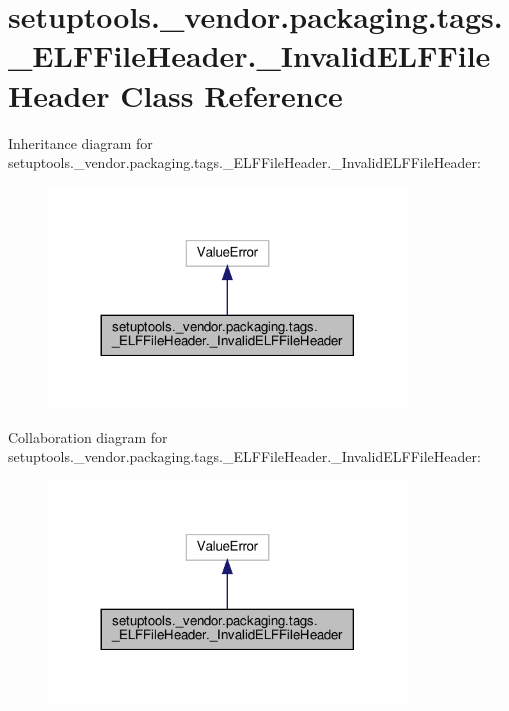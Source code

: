 \hypertarget{classsetuptools_1_1__vendor_1_1packaging_1_1tags_1_1__ELFFileHeader_1_1__InvalidELFFileHeader}{}\section{setuptools.\+\_\+vendor.\+packaging.\+tags.\+\_\+\+E\+L\+F\+File\+Header.\+\_\+\+Invalid\+E\+L\+F\+File\+Header Class Reference}
\label{classsetuptools_1_1__vendor_1_1packaging_1_1tags_1_1__ELFFileHeader_1_1__InvalidELFFileHeader}


Inheritance diagram for setuptools.\+\_\+vendor.\+packaging.\+tags.\+\_\+\+E\+L\+F\+File\+Header.\+\_\+\+Invalid\+E\+L\+F\+File\+Header\+:
\nopagebreak
\begin{figure}[H]
\begin{center}
\leavevmode
\includegraphics[width=269pt]{classsetuptools_1_1__vendor_1_1packaging_1_1tags_1_1__ELFFileHeader_1_1__InvalidELFFileHeader__inherit__graph}
\end{center}
\end{figure}


Collaboration diagram for setuptools.\+\_\+vendor.\+packaging.\+tags.\+\_\+\+E\+L\+F\+File\+Header.\+\_\+\+Invalid\+E\+L\+F\+File\+Header\+:
\nopagebreak
\begin{figure}[H]
\begin{center}
\leavevmode
\includegraphics[width=269pt]{classsetuptools_1_1__vendor_1_1packaging_1_1tags_1_1__ELFFileHeader_1_1__InvalidELFFileHeader__coll__graph}
\end{center}
\end{figure}


